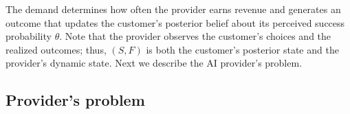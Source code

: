 \documentclass[11pt]{article}
\begin{document}
The demand determines how often the provider earns revenue and generates an outcome that updates the customer's posterior belief about its perceived success probability $\theta$. Note that the provider observes the customer's choices and the realized outcomes; thus, $(S,F)$ is both the customer's posterior state and the provider's dynamic state. Next we describe the AI provider's problem. 

\subsection{Provider's problem}
\end{document}
